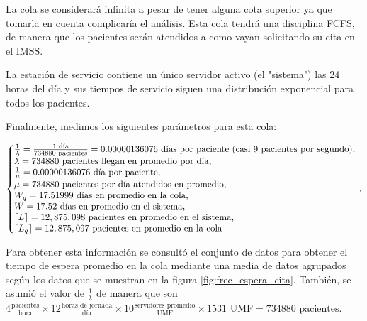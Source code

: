 \documentclass[10pt]{article}
\begin{document}
    La cola se considerará infinita a pesar de tener alguna cota superior ya que tomarla en cuenta complicaría el análisis. Esta cola tendrá una disciplina FCFS, de manera que los pacientes serán atendidos a como vayan solicitando su cita en el IMSS.
    
    La estación de servicio contiene un único servidor activo (el "sistema") las 24 horas del día y sus tiempos de servicio siguen una distribución exponencial para todos los pacientes.
    
    Finalmente, medimos los siguientes parámetros para esta cola:
    
    \newpage
    
    \begin{equation*}
    	\left\{
    	\begin{array}{@{}l@{}}
    		\frac{1}{\lambda} = \frac{1 \text{ día}}{734880 \text{ pacientes}} = 0.00000136076 \text{ días por paciente (casi 9 pacientes por segundo),} \\
    		\lambda = 734880 \text{ pacientes llegan en promedio por día,} \\
    		\frac{1}{\mu} = 0.00000136076 \text{ día por paciente,} \\
    		\mu = 734880 \text{ pacientes por día atendidos en promedio,} \\
    		W_{q} = 17.51999 \text{ días en promedio en la cola,} \\
    		W = 17.52 \text{ días en promedio en el sistema,} \\
    		\left\lceil L \right\rceil = 12,875,098 \text{ pacientes en promedio en el sistema,} \\
    		\left\lceil L_{q} \right\rceil = 12,875,097 \text{ pacientes en promedio en la cola}
    	\end{array}
    	\right.\,.
    \end{equation*}
    
    Para obtener esta información se consultó el conjunto de datos para obtener el tiempo de espera promedio en la cola mediante una media de datos agrupados según los datos que se muestran en la figura \ref{fig:frec_espera_cita}. También, se asumió el valor de $\frac{1}{\lambda}$ de manera que son $4 \frac{\text{pacientes}}{\text{hora}} \times 12 \frac{\text{horas de jornada}}{\text{día}} \times 10 \frac{\text{servidores promedio}}{\text{UMF}} \times 1531 \text{ UMF} = 734880 \text{ pacientes.}$
    
\end{document}
